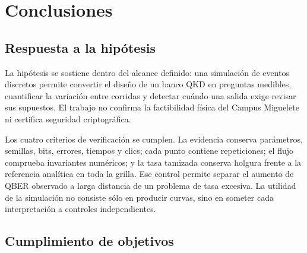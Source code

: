 \chapter{Conclusiones}
\label{chap:conclusiones}

\section{Respuesta a la hipótesis}

La hipótesis se sostiene dentro del alcance definido: una simulación de eventos discretos permite convertir el diseño de un banco QKD en preguntas medibles, cuantificar la variación entre corridas y detectar cuándo una salida exige revisar sus supuestos. El trabajo no confirma la factibilidad física del Campus Miguelete ni certifica seguridad criptográfica.

Los cuatro criterios de verificación se cumplen. La evidencia conserva parámetros, semillas, bits, errores, tiempos y clics; cada punto contiene \PThreeRepetitions{} repeticiones; el flujo comprueba invariantes numéricos; y la tasa tamizada conserva holgura frente a la referencia analítica en toda la grilla. Ese control permite separar el aumento de QBER observado a larga distancia de un problema de tasa excesiva. La utilidad de la simulación no consiste sólo en producir curvas, sino en someter cada interpretación a controles independientes.

\section{Cumplimiento de objetivos}

